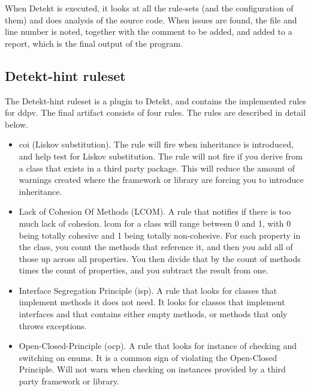 \documentclass{report}
\begin{document}
When Detekt is executed, it looks at all the rule-sets (and the configuration of them) and does analysis of the source code. When issues are found, the file and line number is noted, together with the comment to be added, and added to a report, which is the final output of the program. 

\subsection{Detekt-hint ruleset}
The Detekt-hint ruleset is a plugin to Detekt, and contains the implemented rules for \gls{ddpv}. The final artifact consists of four rules. The rules are described in detail below.

\begin{itemize}
    \item\gls{coi} (Liskov substitution). The rule will fire when inheritance is introduced, and help test for Liskov substitution. The rule will not fire if you derive from a class that exists in a third party package. This will reduce the amount of warnings created where the framework or library are forcing you to introduce inheritance.         
    \item Lack of Cohesion Of Methods (LCOM). A rule that notifies if there is too much lack of cohesion. \gls{lcom} for a class will range between 0 and 1, with 0 being totally cohesive and 1 being totally non-cohesive. For each property in the class, you count the methods that reference it, and then you add all of those up across all properties. You then divide that by the count of methods times the count of properties, and you subtract the result from one\cite{}.
    \item Interface Segregation Principle (\gls{isp}). A rule that looks for classes that implement methods it does not need. It looks for classes that implement interfaces and that contains either empty methods, or methods that only throws exceptions.
    \item Open-Closed-Principle (\gls{ocp}). A rule that looks for instance of checking and switching on enums. It is a common sign of violating the Open-Closed Principle. Will not warn when checking on instances provided by a third party framework or library.
\end{itemize}
\end{document}
